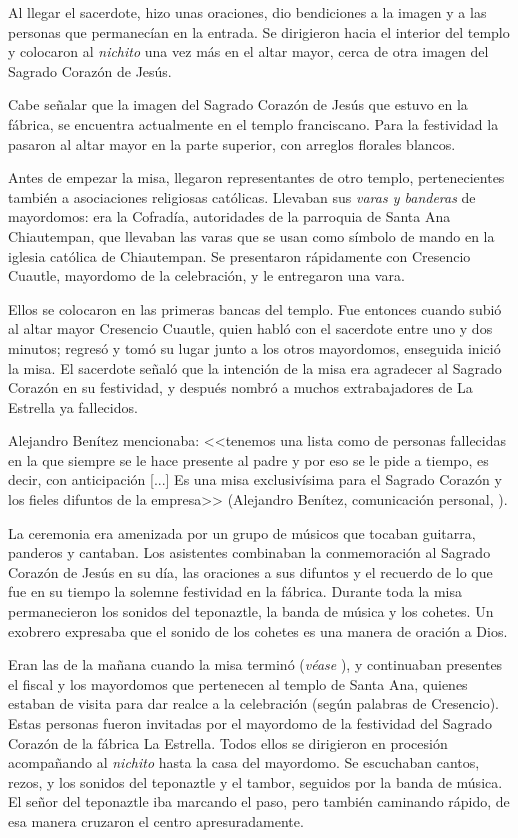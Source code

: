 \documentclass[14pt,letterpaper,twoside]{extbook} %
\begin{document}
Al llegar el sacerdote, hizo unas oraciones, dio bendiciones a la imagen y a las personas que permanecían en la entrada. Se dirigieron hacia el interior del templo y colocaron al \textit{nichito} una vez más en el altar mayor, cerca de otra imagen del Sagrado Corazón de Jesús.

Cabe señalar que la imagen del Sagrado Corazón de Jesús que estuvo en la fábrica, se encuentra actualmente en el templo franciscano. Para la festividad la pasaron al altar mayor en la parte superior, con arreglos florales blancos.

Antes de empezar la misa, llegaron representantes de otro templo, pertenecientes también a asociaciones religiosas católicas. Llevaban sus \textit{varas y banderas} de mayordomos: era la Cofradía, autoridades de la parroquia de Santa Ana Chiautempan, que llevaban las varas que se usan como símbolo de mando en la iglesia católica de Chiautempan. Se presentaron rápidamente con Cresencio Cuautle, mayordomo de la celebración, y le entregaron una vara.

Ellos se colocaron en las primeras bancas del templo. Fue entonces cuando subió al altar mayor Cresencio Cuautle, quien habló con el sacerdote entre uno y dos minutos; regresó y tomó su lugar junto a los otros mayordomos, enseguida inició la misa. El sacerdote señaló que la intención de la misa era agradecer al Sagrado Corazón en su festividad, y después nombró a muchos extrabajadores de La Estrella ya fallecidos.

Alejandro Benítez mencionaba: <<tenemos una lista como de  personas fallecidas en la que siempre se le hace presente al padre y por eso se le pide a tiempo, es decir, con anticipación [...] Es una misa exclusivísima para el Sagrado Corazón y los fieles difuntos de la empresa>> (Alejandro Benítez, comunicación personal, ).

La ceremonia era amenizada por un grupo de músicos que tocaban guitarra, panderos y cantaban. Los asistentes combinaban la conmemoración al Sagrado Corazón de Jesús en su día, las oraciones a sus difuntos y el recuerdo de lo que fue en su tiempo la solemne festividad en la fábrica. Durante toda la misa permanecieron los sonidos del teponaztle, la banda de música y los cohetes. Un exobrero expresaba que el sonido de los cohetes es una manera de oración a Dios.

Eran las  de la mañana cuando la misa terminó (\emph{véase} ), y continuaban presentes el fiscal y los mayordomos que pertenecen al templo de Santa Ana, quienes estaban de visita para dar realce a la celebración (según palabras de Cresencio). Estas personas fueron invitadas por el mayordomo de la festividad del Sagrado Corazón de la fábrica La Estrella. Todos ellos se dirigieron en procesión acompañando al \textit{nichito} hasta la casa del mayordomo. Se escuchaban cantos, rezos, y los sonidos del teponaztle y el tambor, seguidos por la banda de música. El señor del teponaztle iba marcando el paso, pero también caminando rápido, de esa manera cruzaron el centro apresuradamente.
\end{document}
